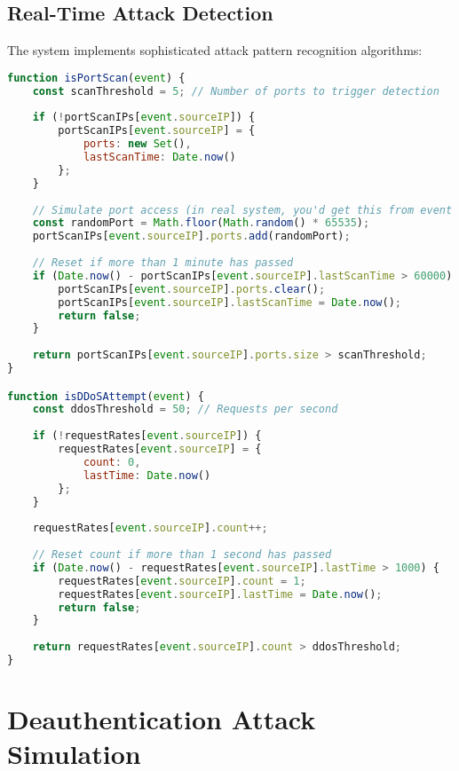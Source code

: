 \documentclass[12pt,a4paper]{report}
\begin{document}
\subsection{Real-Time Attack Detection}

The system implements sophisticated attack pattern recognition algorithms:

\begin{lstlisting}[language=JavaScript,caption={Port Scanning Detection Algorithm}]
function isPortScan(event) {
    const scanThreshold = 5; // Number of ports to trigger detection
    
    if (!portScanIPs[event.sourceIP]) {
        portScanIPs[event.sourceIP] = {
            ports: new Set(),
            lastScanTime: Date.now()
        };
    }
    
    // Simulate port access (in real system, you'd get this from event data)
    const randomPort = Math.floor(Math.random() * 65535);
    portScanIPs[event.sourceIP].ports.add(randomPort);
    
    // Reset if more than 1 minute has passed
    if (Date.now() - portScanIPs[event.sourceIP].lastScanTime > 60000) {
        portScanIPs[event.sourceIP].ports.clear();
        portScanIPs[event.sourceIP].lastScanTime = Date.now();
        return false;
    }
    
    return portScanIPs[event.sourceIP].ports.size > scanThreshold;
}

function isDDoSAttempt(event) {
    const ddosThreshold = 50; // Requests per second
    
    if (!requestRates[event.sourceIP]) {
        requestRates[event.sourceIP] = {
            count: 0,
            lastTime: Date.now()
        };
    }
    
    requestRates[event.sourceIP].count++;
    
    // Reset count if more than 1 second has passed
    if (Date.now() - requestRates[event.sourceIP].lastTime > 1000) {
        requestRates[event.sourceIP].count = 1;
        requestRates[event.sourceIP].lastTime = Date.now();
        return false;
    }
    
    return requestRates[event.sourceIP].count > ddosThreshold;
}
\end{lstlisting}

\section{Deauthentication Attack Simulation}
\end{document}
